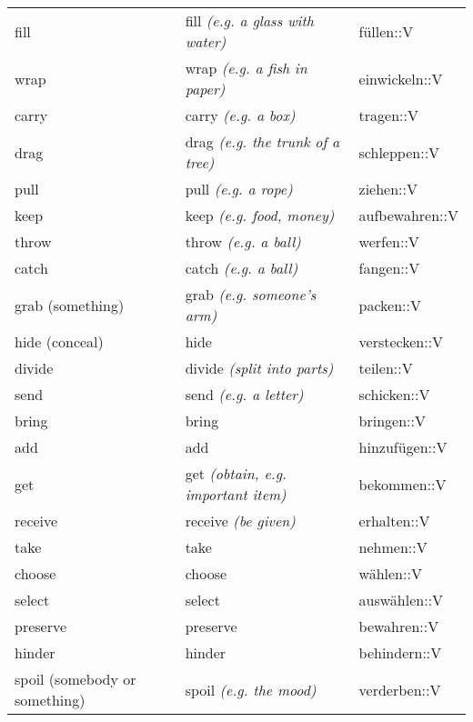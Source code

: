 \begin{center}
\begin{longtable}{lll}
{\sc \lowercase{	FILL	}}	&	fill	\textit{\footnotesize (e.g. a glass with water)}	&	füllen::V	\\
{\sc \lowercase{	WRAP	}}	&	wrap	\textit{\footnotesize (e.g. a fish in paper)}	&	einwickeln::V	\\
{\sc \lowercase{	CARRY	}}	&	carry	\textit{\footnotesize (e.g. a box)}	&	tragen::V	\\
{\sc \lowercase{	DRAG	}}	&	drag	\textit{\footnotesize (e.g. the trunk of a tree)}	&	schleppen::V	\\
{\sc \lowercase{	PULL	}}	&	pull	\textit{\footnotesize (e.g. a rope)}	&	ziehen::V	\\
{\sc \lowercase{	KEEP	}}	&	keep	\textit{\footnotesize (e.g. food, money)}	&	aufbewahren::V	\\
{\sc \lowercase{	THROW	}}	&	throw	\textit{\footnotesize (e.g. a ball)}	&	werfen::V	\\
{\sc \lowercase{	CATCH	}}	&	catch	\textit{\footnotesize (e.g. a ball)}	&	fangen::V	\\
{\sc \lowercase{	GRAB \footnotesize (SOMETHING)	}}	&	grab	\textit{\footnotesize (e.g. someone's arm)}	&	packen::V	\\
{\sc \lowercase{	HIDE \footnotesize (CONCEAL)	}}	&	hide		&	verstecken::V	\\
{\sc \lowercase{	DIVIDE	}}	&	divide	\textit{\footnotesize (split into parts)}	&	teilen::V	\\
{\sc \lowercase{	SEND	}}	&	send	\textit{\footnotesize (e.g. a letter)}	&	schicken::V	\\
{\sc \lowercase{	BRING	}}	&	bring		&	bringen::V	\\
{\sc \lowercase{	ADD	}}	&	add		&	hinzufügen::V	\\
{\sc \lowercase{	GET	}}	&	get	\textit{\footnotesize (obtain, e.g. important item)}	&	bekommen::V	\\
{\sc \lowercase{	RECEIVE	}}	&	receive	\textit{\footnotesize (be given)}	&	erhalten::V	\\
{\sc \lowercase{	TAKE	}}	&	take		&	nehmen::V	\\
{\sc \lowercase{	CHOOSE	}}	&	choose		&	wählen::V	\\
{\sc \lowercase{	SELECT	}}	&	select		&	auswählen::V	\\
{\sc \lowercase{	PRESERVE	}}	&	preserve		&	bewahren::V	\\
{\sc \lowercase{	HINDER	}}	&	hinder		&	behindern::V	\\
{\sc \lowercase{	\footnotesize SPOIL \scriptsize  (SOMEBODY OR SOMETHING)	}}	&	spoil	\textit{\footnotesize (e.g. the mood)}	&	verderben::V	\\

\end{longtable}
\end{center}
